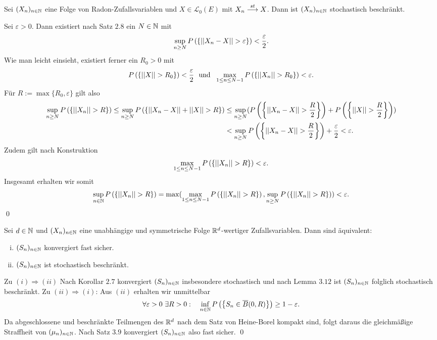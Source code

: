 \begin{lemma}
    Sei $(X_n)_{n \in \mathbb{N}}$ eine Folge von Radon-Zufallsvariablen und $X \in \mathcal{L}_0(E)$ mit $X_n \overset{st}{\longrightarrow} X$. Dann ist $(X_n)_{n \in \mathbb{N}}$ stochastisch beschränkt. 
\end{lemma}
\begin{proof*}
    Sei $\varepsilon > 0$. Dann existiert nach Satz $2.8$ ein $N \in \mathbb{N}$ mit 
    $$
        \sup_{n \geq N}P\left(\left\{ \lvert\lvert X_n - X \rvert\rvert > \varepsilon \right\}\right) < \frac{\varepsilon}{2}.
    $$
    Wie man leicht einsieht, existiert ferner ein $R_0 > 0$ mit 
    $$
        P\left(\left\{  \lvert\lvert X \rvert\rvert > R_0 \right\}\right) < \frac{\varepsilon}{2} \ \text{ und } \ \max_{1 \leq n \leq N-1}P\left(\left\{ \lvert\lvert X_n \rvert\rvert > R_0 \right\}\right) < \varepsilon.
    $$
    Für $R := \max\{R_0, \varepsilon\}$ gilt also 
    \begin{align*}
        \sup_{n \geq N}P\left(\left\{ \lvert\lvert X_n \rvert\rvert > R \right\}\right) \leq \sup_{n \geq N}P\left(\left\{ \lvert\lvert X_n - X \rvert\rvert + \lvert\lvert X \rvert\rvert > R \right\}\right) 
                                            &\leq \sup_{n \geq N}(P\left(\left\{ \lvert\lvert X_n - X \rvert\rvert > \frac{R}{2} \right\}\right) + P\left(\left\{ \lvert\lvert X \rvert\rvert > \frac{R}{2} \right\}\right)) \\\
                                            &< \sup_{n \geq N}P\left(\left\{ \lvert\lvert X_n - X \rvert\rvert > \frac{R}{2} \right\}\right) + \frac{\varepsilon}{2} < \varepsilon. 
    \end{align*}
    Zudem gilt nach Konstruktion
    $$
        \max_{1\leq n \leq N-1}P\left(\left\{ \lvert\lvert X_n \rvert\rvert > R \right\}\right) < \varepsilon. 
    $$
    Insgesamt erhalten wir somit 
    $$
        \sup_{n \in \mathbb{N}} P\left(\left\{ \lvert\lvert X_n \rvert\rvert>R \right\}\right)= \max(\max_{1\leq n \leq N-1}P\left(\left\{ \lvert\lvert X_n \rvert\rvert > R \right\}\right),\sup_{n \geq N}P\left(\left\{ \lvert\lvert X_n \rvert\rvert> R \right\}\right)) < \varepsilon. 
    $$
    \qed 
\end{proof*}
\begin{corollary}
    Sei $d \in \mathbb{N}$ und $(X_n)_{n \in \mathbb{N}}$ eine unabhängige und symmetrische Folge $\mathbb{R}^d$-wertiger Zufallsvariablen. Dann sind äquivalent: 
    \begin{enumerate}[(i)]
        \item $(S_n)_{n \in \mathbb{N}}$ konvergiert fast sicher. 
        \item $(S_n)_{n \in \mathbb{N}}$ ist stochastisch beschränkt. 
    \end{enumerate} 
\end{corollary}
\begin{proof*}
    Zu $(i) \Rightarrow (ii)$ Nach Korollar $2.7$ konvergiert $(S_n)_{n \in \mathbb{N}}$ insbesondere stochastisch und nach Lemma $3.12$ ist $(S_n)_{n \in \mathbb{N}}$ folglich stochastisch beschränkt.   
    \newline Zu $(ii) \Rightarrow (i)$: Aus $(ii)$ erhalten wir unmittelbar
    $$
        \forall \varepsilon > 0 \ \exists R > 0: \quad \inf_{n \in \mathbb{N}}P\left(\left\{ S_n \in \overline{B}(0,R) \right\}\right) \geq 1 - \varepsilon.
    $$
    Da abgeschlossene und beschränkte Teilmengen des $\mathbb{R}^d$ nach dem Satz von Heine-Borel kompakt sind, folgt daraus die gleichmäßige Straffheit von $(\mu_n)_{n \in \mathbb{N}}$. 
    Nach Satz $3.9$ konvergiert $(S_n)_{n \in \mathbb{N}}$ also fast sicher. \qed 
\end{proof*}



